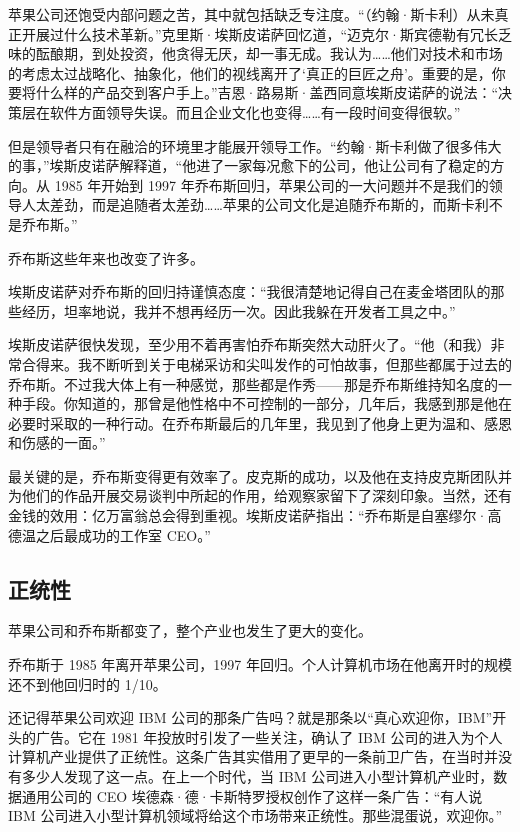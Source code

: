 \documentclass[12pt,UTF8]{ctexbook}
\begin{document}
苹果公司还饱受内部问题之苦，其中就包括缺乏专注度。“（约翰·斯卡利）从未真正开展过什么技术革新。”克里斯·埃斯皮诺萨回忆道，“迈克尔·斯宾德勒有冗长乏味的酝酿期，到处投资，他贪得无厌，却一事无成。我认为……他们对技术和市场的考虑太过战略化、抽象化，他们的视线离开了‘真正的巨匠之舟’。重要的是，你要将什么样的产品交到客户手上。”吉恩·路易斯·盖西同意埃斯皮诺萨的说法：“决策层在软件方面领导失误。而且企业文化也变得……有一段时间变得很软。”

但是领导者只有在融洽的环境里才能展开领导工作。“约翰·斯卡利做了很多伟大的事，”埃斯皮诺萨解释道，“他进了一家每况愈下的公司，他让公司有了稳定的方向。从 1985 年开始到 1997 年乔布斯回归，苹果公司的一大问题并不是我们的领导人太差劲，而是追随者太差劲……苹果的公司文化是追随乔布斯的，而斯卡利不是乔布斯。”

乔布斯这些年来也改变了许多。

埃斯皮诺萨对乔布斯的回归持谨慎态度：“我很清楚地记得自己在麦金塔团队的那些经历，坦率地说，我并不想再经历一次。因此我躲在开发者工具之中。”

埃斯皮诺萨很快发现，至少用不着再害怕乔布斯突然大动肝火了。“他（和我）非常合得来。我不断听到关于电梯采访和尖叫发作的可怕故事，但那些都属于过去的乔布斯。不过我大体上有一种感觉，那些都是作秀——那是乔布斯维持知名度的一种手段。你知道的，那曾是他性格中不可控制的一部分，几年后，我感到那是他在必要时采取的一种行动。在乔布斯最后的几年里，我见到了他身上更为温和、感恩和伤感的一面。”

最关键的是，乔布斯变得更有效率了。皮克斯的成功，以及他在支持皮克斯团队并为他们的作品开展交易谈判中所起的作用，给观察家留下了深刻印象。当然，还有金钱的效用：亿万富翁总会得到重视。埃斯皮诺萨指出：“乔布斯是自塞缪尔·高德温之后最成功的工作室 CEO。”





\subsection{正统性}


苹果公司和乔布斯都变了，整个产业也发生了更大的变化。

乔布斯于 1985 年离开苹果公司，1997 年回归。个人计算机市场在他离开时的规模还不到他回归时的 1/10。

还记得苹果公司欢迎 IBM 公司的那条广告吗？就是那条以“真心欢迎你，IBM”开头的广告。它在 1981 年投放时引发了一些关注，确认了 IBM 公司的进入为个人计算机产业提供了正统性。这条广告其实借用了更早的一条前卫广告，在当时并没有多少人发现了这一点。在上一个时代，当 IBM 公司进入小型计算机产业时，数据通用公司的 CEO 埃德森·德·卡斯特罗授权创作了这样一条广告：“有人说 IBM 公司进入小型计算机领域将给这个市场带来正统性。那些混蛋说，欢迎你。”
\end{document}

